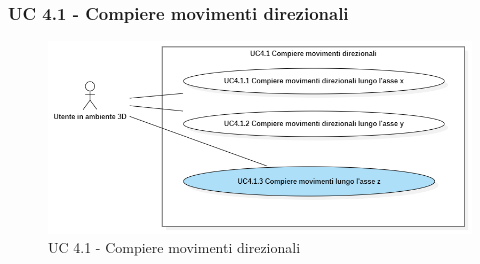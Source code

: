 \subsubsection{UC 4.1 - Compiere movimenti direzionali}

\begin{figure}[H]
  \renewcommand{\thefigure}{6}
  \includegraphics[width=\linewidth]{./res/images/UC4.1.png}
  \caption{UC 4.1 - Compiere movimenti direzionali}
  \label{fig:UC 4.1}
\end{figure}

